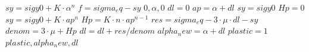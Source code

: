

\begin{algorithmic}
\State $sy = sigy0 + K \cdot \alpha^{n}$
\State $f = sigma_eq - sy$
    \Return $0, \alpha, 0$
\EndIf
\State $dl = 0$
    \State $ap = \alpha + dl$
        \State $sy = sigy0$
        \State $Hp = 0$
    \Else
        \State $sy = sigy0 + K \cdot ap^{n}$
        \State $Hp = K \cdot n \cdot ap^{n - 1}$
    \EndIf
    \State $res = sigma_eq - 3 \cdot \mu \cdot dl - sy$
    \State $denom = 3 \cdot \mu + Hp$
    \State $dl = dl + res / denom$
\EndFor
\State $alpha_new = \alpha + dl$
\State $plastic = 1$
\Return $plastic, alpha_new, dl$
\end{algorithmic}
